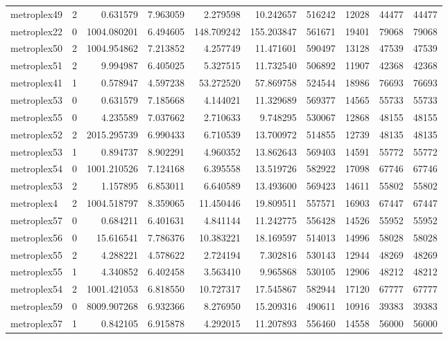 \begin{longtable}{|l|r|r|r|r|r|r|r|r|r|}
metroplex49 & 2 & 0.631579 & 7.963059 & 2.279598 & 10.242657 & 516242 & 12028 & 44477 & 44477 \\
metroplex22 & 0 & 1004.080201 & 6.494605 & 148.709242 & 155.203847 & 561671 & 19401 & 79068 & 79068 \\
metroplex50 & 2 & 1004.954862 & 7.213852 & 4.257749 & 11.471601 & 590497 & 13128 & 47539 & 47539 \\
metroplex51 & 2 & 9.994987 & 6.405025 & 5.327515 & 11.732540 & 506892 & 11907 & 42368 & 42368 \\
metroplex41 & 1 & 0.578947 & 4.597238 & 53.272520 & 57.869758 & 524544 & 18986 & 76693 & 76693 \\
metroplex53 & 0 & 0.631579 & 7.185668 & 4.144021 & 11.329689 & 569377 & 14565 & 55733 & 55733 \\
metroplex55 & 0 & 4.235589 & 7.037662 & 2.710633 & 9.748295 & 530067 & 12868 & 48155 & 48155 \\
metroplex52 & 2 & 2015.295739 & 6.990433 & 6.710539 & 13.700972 & 514855 & 12739 & 48135 & 48135 \\
metroplex53 & 1 & 0.894737 & 8.902291 & 4.960352 & 13.862643 & 569403 & 14591 & 55772 & 55772 \\
metroplex54 & 0 & 1001.210526 & 7.124168 & 6.395558 & 13.519726 & 582922 & 17098 & 67746 & 67746 \\
metroplex53 & 2 & 1.157895 & 6.853011 & 6.640589 & 13.493600 & 569423 & 14611 & 55802 & 55802 \\
metroplex4 & 2 & 1004.518797 & 8.359065 & 11.450446 & 19.809511 & 557571 & 16903 & 67447 & 67447 \\
metroplex57 & 0 & 0.684211 & 6.401631 & 4.841144 & 11.242775 & 556428 & 14526 & 55952 & 55952 \\
metroplex56 & 0 & 15.616541 & 7.786376 & 10.383221 & 18.169597 & 514013 & 14996 & 58028 & 58028 \\
metroplex55 & 2 & 4.288221 & 4.578622 & 2.724194 & 7.302816 & 530143 & 12944 & 48269 & 48269 \\
metroplex55 & 1 & 4.340852 & 6.402458 & 3.563410 & 9.965868 & 530105 & 12906 & 48212 & 48212 \\
metroplex54 & 2 & 1001.421053 & 6.818550 & 10.727317 & 17.545867 & 582944 & 17120 & 67777 & 67777 \\
metroplex59 & 0 & 8009.907268 & 6.932366 & 8.276950 & 15.209316 & 490611 & 10916 & 39383 & 39383 \\
metroplex57 & 1 & 0.842105 & 6.915878 & 4.292015 & 11.207893 & 556460 & 14558 & 56000 & 56000 \\

\end{longtable}
